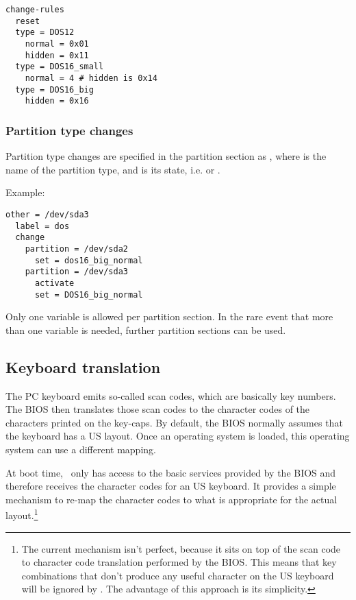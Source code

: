 \begin{verbatim}
change-rules
  reset
  type = DOS12
    normal = 0x01
    hidden = 0x11
  type = DOS16_small
    normal = 4 # hidden is 0x14
  type = DOS16_big
    hidden = 0x16
\end{verbatim}


\subsubsection{Partition type changes}
\label{ptch}

Partition type changes are specified in the partition section as
\craw{\_}, where  is the
name of the partition type, and  is its state, i.e.
 or .

Example:

\begin{verbatim}
other = /dev/sda3
  label = dos
  change
    partition = /dev/sda2
      set = dos16_big_normal
    partition = /dev/sda3
      activate
      set = DOS16_big_normal
\end{verbatim}

Only one  variable is allowed per partition section. In the
rare event that more than one  variable is needed, further
partition sections can be used.


\subsection{Keyboard translation}
\label{keytab}

The PC keyboard emits so-called scan codes, which are basically key
numbers. The BIOS then translates those scan codes to the character codes
of the characters printed on the key-caps. By default, the BIOS normally
assumes that the keyboard has a US layout. Once an operating system is
loaded, this operating system can use a different mapping.

At boot time, \LILO\ only has access to the basic services provided
by the BIOS and therefore receives the character codes for an US keyboard.
It provides a simple mechanism to re-map the character codes to what is
appropriate for the actual layout.\footnote{The current mechanism isn't
perfect, because it sits on top of the scan code to character code
translation performed by the BIOS. This means that key combinations that
don't produce any useful character on the US keyboard will be ignored by
\LILO. The advantage of this approach is its simplicity.}


